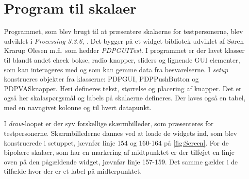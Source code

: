 \section{Program til skalaer}
\label{TestAfSkalaProgramSkala}
%
Programmet, som blev brugt til at præsentere skalaerne for testpersonerne, blev udviklet i \textit{Processing 3.3.6}, \parencite{WEB:Processing3}. Det bygger på et widget-bibliotek udviklet af Søren Krarup Olesen m.fl. som hedder \textit{PDPGUITest}. I programmet er der lavet klasser til blandt andet check bokse, radio knapper, sliders og lignende GUI elementer, som kan interageres med og som kan gemme data fra besvarelserne.\blankline 
%
I \textit{setup} konstrueres objekter fra klasserne: PDPGUI, PDPPushButton og PDPVASknapper. Heri defineres tekst, størrelse og placering af knapper. Det er også her skalaspørgsmål og labels på skalaerne defineres. Der laves også en tabel, med en navngivet kolonne og til hvert datapunkt.

I \textit{draw}-loopet er der syv forskellige skærmbilleder, som præsenteres for testpersonerne. Skærmbillederne dannes ved at loade de widgets ind, som blev konstruerede i setuppet, jævnfør linje 154 og 160-164 på \autoref{fig:Screen}. For de bipolære skalaer, som har en markering af midtpunktet er der tilføjet en linje oven på den pågældende widget, jævnfør linje 157-159. Det samme gælder i de tilfælde hvor der er et label på midterpunktet.
 
